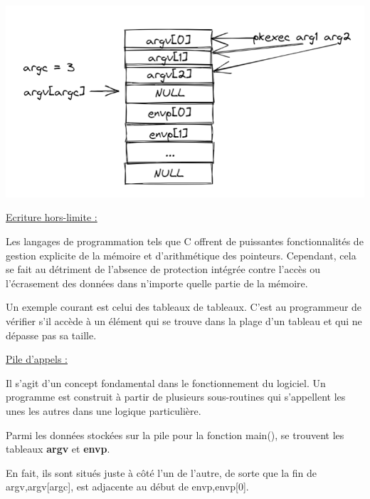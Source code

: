 \documentclass[12pt,a4paper]{article}
\begin{document}
\begin{flushleft}
                \begin{center}
                    \includegraphics[scale=0.6]{main}
                \end{center}
            \underline{Ecriture hors-limite : }
                \item Les langages de programmation tels que C offrent de puissantes fonctionnalités de gestion explicite de la mémoire et d’arithmétique des pointeurs. Cependant, cela se fait au détriment de l’absence de protection intégrée contre l’accès ou l’écrasement des données dans n’importe quelle partie de la mémoire.
                \item Un exemple courant est celui des tableaux de tableaux. C’est au programmeur de vérifier s’il accède à un élément qui se trouve dans la plage d’un tableau et qui ne dépasse pas sa taille.
            \item \underline{Pile d’appels :}
                \item Il s’agit d’un concept fondamental dans le fonctionnement du logiciel. Un programme est construit à partir de plusieurs sous-routines qui s’appellent les unes les autres dans une logique particulière.
                \item Parmi les données stockées sur la pile pour la fonction main(), se trouvent les tableaux \textbf{argv} et \textbf{envp}.
                \item En fait, ils sont situés juste à côté l’un de l’autre, de sorte que la fin de argv,argv[argc], est adjacente au début de envp,envp[0].


\end{flushleft}
\end{document}
